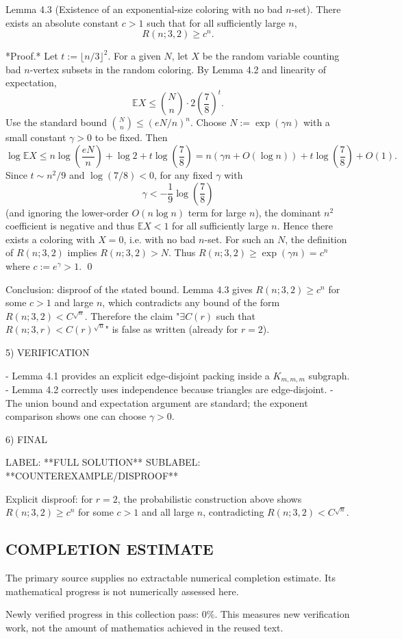 Lemma 4.3 (Existence of an exponential-size coloring with no bad $n$-set).
There exists an absolute constant $c>1$ such that for all sufficiently large $n$,
\[
R(n;3,2) \ge c^n.
\]

*Proof.* Let $t:=\lfloor n/3\rfloor^2$.
For a given $N$, let $X$ be the random variable counting bad $n$-vertex subsets in the random coloring.
By Lemma 4.2 and linearity of expectation,
\[
\mathbb{E}X \le \binom{N}{n}\cdot 2\left(\frac78\right)^t.
\]
Use the standard bound $\binom{N}{n}\le (eN/n)^n$.
Choose $N:=\exp(\gamma n)$ with a small constant $\gamma>0$ to be fixed.
Then
\[
\log \mathbb{E}X \le n\log\left(\frac{eN}{n}\right) + \log 2 + t\log\left(\frac78\right)
= n\left(\gamma n + O(\log n)\right) + t\log\left(\frac78\right) + O(1).
\]
Since $t\sim n^2/9$ and $\log(7/8)<0$, for any fixed $\gamma$ with
\[
\gamma < -\frac{1}{9}\log\left(\frac78\right)
\]
(and ignoring the lower-order $O(n\log n)$ term for large $n$), the dominant $n^2$ coefficient is negative and thus $\mathbb{E}X<1$ for all sufficiently large $n$.
Hence there exists a coloring with $X=0$, i.e. with no bad $n$-set.
For such an $N$, the definition of $R(n;3,2)$ implies $R(n;3,2)>N$.
Thus $R(n;3,2)\ge \exp(\gamma n)=c^n$ where $c:=e^\gamma>1$.
\qed

Conclusion: disproof of the stated bound.
Lemma 4.3 gives $R(n;3,2)\ge c^n$ for some $c>1$ and large $n$, which contradicts any bound of the form $R(n;3,2) < C^{\sqrt{n}}$.
Therefore the claim "$\exists C(r)$ such that $R(n;3,r) < C(r)^{\sqrt{n}}$" is false as written (already for $r=2$).

5) VERIFICATION

- Lemma 4.1 provides an explicit edge-disjoint packing inside a $K_{m,m,m}$ subgraph.
- Lemma 4.2 correctly uses independence because triangles are edge-disjoint.
- The union bound and expectation argument are standard; the exponent comparison shows one can choose $\gamma>0$.

6) FINAL

LABEL: **FULL SOLUTION**
SUBLABEL: **COUNTEREXAMPLE/DISPROOF**

Explicit disproof: for $r=2$, the probabilistic construction above shows $R(n;3,2)\ge c^n$ for some $c>1$ and all large $n$, contradicting $R(n;3,2)<C^{\sqrt{n}}$.




\subsection*{COMPLETION ESTIMATE}
The primary source supplies no extractable numerical completion estimate. Its mathematical progress is not numerically assessed here.

Newly verified progress in this collection pass: $0\%$. This measures new verification work, not the amount of mathematics achieved in the reused text.
